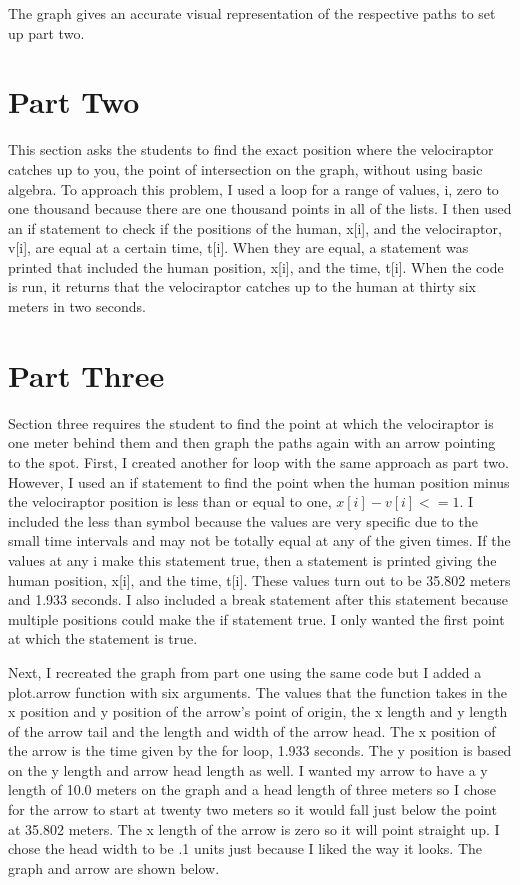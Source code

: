 \documentclass[twocolumn]{revtex4}
\begin{document}
The graph gives an accurate visual representation of the respective paths to set up part two.


\section{Part Two}
This section asks the students to find the exact position where the velociraptor catches up to you, the point of intersection on the graph, without using basic algebra. To approach this problem, I used a loop for a range of values, i, zero to one thousand because there are one thousand points in all of the lists. I then used an if statement to check if the positions of the human, x[i], and the velociraptor, v[i], are equal at a certain time, t[i]. When they are equal, a statement was printed that included the human position, x[i], and the time, t[i]. When the code is run, it returns that the velociraptor catches up to the human at thirty six meters in two seconds.
\section{Part Three}
Section three requires the student to find the point at which the velociraptor is one meter behind them and then graph the paths again with an arrow pointing to the spot. First, I created another for loop with the same approach as part two. However, I used an if statement to find the point when the human position minus the velociraptor position is less than or equal to one, $x[i]-v[i]<=1$. I included the less than symbol because the values are very specific due to the small time intervals and may not be totally equal at any of the given times. If the values at any i make this statement true, then a statement is printed giving the human position, x[i], and the time, t[i]. These values turn out to be 35.802 meters and 1.933 seconds. I also included a break statement after this statement because multiple positions could make the if statement true. I only wanted the first point at which the statement is true.

Next, I recreated the graph from part one using the same code but I added a plot.arrow function with six arguments. The values that the function takes in the x position and y position of the arrow's point of origin, the x length and y length of the arrow tail and the length and width of the arrow head. The x position of the arrow is the time given by the for loop, 1.933 seconds. The y position is based on the y length and arrow head length as well. I wanted my arrow to have a y length of 10.0 meters on the graph and a head length of three meters so I chose for the arrow to start at twenty two meters so it would fall just below the point at 35.802 meters. The x length of the arrow is zero so it will point straight up. I chose the head width to be .1 units just because I liked the way it looks. The graph and arrow are shown below.
\end{document}
